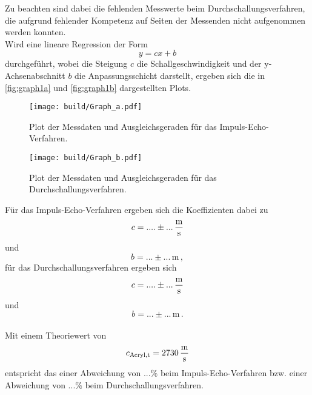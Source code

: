 Zu beachten sind dabei die fehlenden Messwerte beim Durchschallungsverfahren, die aufgrund fehlender Kompetenz auf Seiten der Messenden nicht aufgenommen werden konnten. \\

Wird eine lineare Regression der Form
\begin{equation*}
    y = c x + b
\end{equation*}
durchgeführt, wobei die Steigung $c$ die Schallgeschwindigkeit und der y-Achsenabschnitt $b$ die Anpassungsschicht darstellt, ergeben sich die in \autoref{fig:graph1a} und \autoref{fig:graph1b} dargestellten Plots.
    
\begin{figure}[H]
        \centering
        \texttt{[image: build/Graph\_a.pdf]} 
        \caption{Plot der Messdaten und Ausgleichsgeraden für das Impuls-Echo-Verfahren.}
        \label{fig:graph1a}
\end{figure}

\begin{figure}[H]
    \centering
    \texttt{[image: build/Graph\_b.pdf]} 
    \caption{Plot der Messdaten und Ausgleichsgeraden für das Durchschallungsverfahren.}
    \label{fig:graph1b}
\end{figure}

Für das Impuls-Echo-Verfahren ergeben sich die Koeffizienten dabei zu
\begin{equation*}
    c = .... \pm ... \,\unit{\frac{\meter}{\second}}
\end{equation*}
und
\begin{equation*}
    b = ... \pm ... \,\unit{\meter} \,,
\end{equation*}
für das Durchschallungsverfahren ergeben sich
\begin{equation*}
    c = .... \pm ... \,\unit{\frac{\meter}{\second}}
\end{equation*}
und
\begin{equation*}
    b = ... \pm ... \,\unit{\meter} \,.
\end{equation*} \\

Mit einem Theoriewert von
\begin{equation*}
    c_{\text{Acryl},\text{t}} = 2730 \,\unit{\frac{\meter}{\second}} 
\end{equation*}
entspricht das einer Abweichung von $... \%$ beim Impuls-Echo-Verfahren bzw. einer Abweichung von $... \%$ beim Durchschallungsverfahren.

